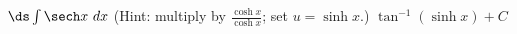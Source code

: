 {$\ds \int \sech x \ dx$ \quad(Hint: multiply by $\frac{\cosh x}{\cosh x}$; set $u = \sinh x$.)}
{$\tan^{-1}(\sinh x)+C$}
